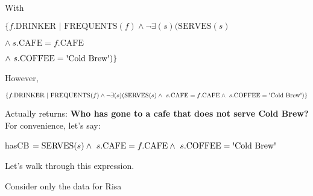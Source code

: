 \documentclass{article}
\begin{document}
With 

$\{f.\textrm{DRINKER } | \textrm{ FREQUENTS}(f) \wedge \neg \exists(s)(\textrm{SERVES}(s)   $

\hspace{2em} $\wedge\ s.\textrm{CAFE} = f.\textrm{CAFE}$

\hspace{2em} $\wedge\ s.\textrm{COFFEE} = \textrm{\textquotesingle{Cold} Brew\textquotesingle}) \}$


\newpage

\hspace{-2em}However, 

$\{f.\textrm{DRINKER } | \textrm{ FREQUENTS}(f) \wedge \neg \exists(s)(\textrm{SERVES}(s) \wedge\ s.\textrm{CAFE} = f.\textrm{CAFE}\wedge\ s.\textrm{COFFEE} = \textrm{\textquotesingle{Cold} Brew\textquotesingle}) \}$

\hspace{-2em}Actually returns: \textbf{Who has gone to a cafe that does not serve Cold Brew?}\\

\hspace{-2em}For convenience, let's say:
 
hasCB $ = \textrm{SERVES}(s) \wedge\ s.\textrm{CAFE} = f.\textrm{CAFE}\wedge\ s.\textrm{COFFEE} = \textrm{\textquotesingle{Cold} Brew\textquotesingle}$



\hspace{-2em}Let's walk through this  expression.

Consider only the data for Risa
\end{document}
